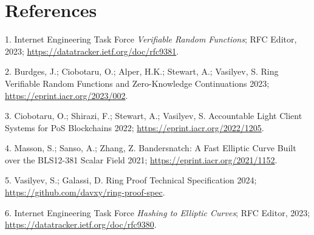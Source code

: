 \documentclass[
]{article}
\newlength{\cslhangindent}
\newenvironment{CSLReferences}[2] %
 {\begin{list}{}{%
  \setlength{\itemindent}{0pt}
  \setlength{\leftmargin}{0pt}
  \setlength{\parsep}{0pt}
  \ifodd #1
   \setlength{\leftmargin}{\cslhangindent}
   \setlength{\itemindent}{-1\cslhangindent}
  \fi
  \setlength{\itemsep}{#2\baselineskip}}}
 {\end{list}}
\begin{document}
\section*{References}\label{references}

\label{refs}
\begin{CSLReferences}{0}{0}
1. Internet Engineering Task Force \emph{{Verifiable Random Functions}};
{RFC Editor}, 2023; \url{https://datatracker.ietf.org/doc/rfc9381}.

2. Burdges, J.; Ciobotaru, O.; Alper, H.K.; Stewart, A.; Vasilyev, S.
Ring Verifiable Random Functions and Zero-Knowledge Continuations 2023;
\url{https://eprint.iacr.org/2023/002}.

3. Ciobotaru, O.; Shirazi, F.; Stewart, A.; Vasilyev, S. Accountable
Light Client Systems for PoS Blockchains 2022;
\url{https://eprint.iacr.org/2022/1205}.

4. Masson, S.; Sanso, A.; Zhang, Z. Bandersnatch: A Fast Elliptic Curve
Built over the BLS12-381 Scalar Field 2021;
\url{https://eprint.iacr.org/2021/1152}.

5. Vasilyev, S.; Galassi, D. Ring Proof Technical Specification 2024;
\url{https://github.com/davxy/ring-proof-spec}.

6. Internet Engineering Task Force \emph{{Hashing to Elliptic Curves}};
{RFC Editor}, 2023; \url{https://datatracker.ietf.org/doc/rfc9380}.

\end{CSLReferences}
\end{document}
